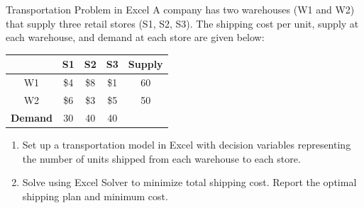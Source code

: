 \begin{ex}{Transportation Problem in Excel}{}
\label{ex:excel-transportation}
 A company has two warehouses (W1 and W2) that supply three retail stores (S1, S2, S3). The shipping cost per unit, supply at each warehouse, and demand at each store are given below:

\begin{center}
\begin{tabular}{c|c|c|c|c}
 & S1 & S2 & S3 & \textbf{Supply} \\
\hline
W1 & \$4 & \$8 & \$1 & 60 \\
W2 & \$6 & \$3 & \$5 & 50 \\
\hline
\textbf{Demand} & 30 & 40 & 40 & \\
\end{tabular}
\par{}\label{tab:software-excel-tab03}%

\end{center}

\begin{enumerate}
\item Set up a transportation model in Excel with decision variables representing the number of units shipped from each warehouse to each store.
\item Solve using Excel Solver to minimize total shipping cost. Report the optimal shipping plan and minimum cost.
\end{enumerate}
\exrefs{\S\ref{sec:excel-solver}, \S\ref{sec:transportation-problem}}
\end{ex}

